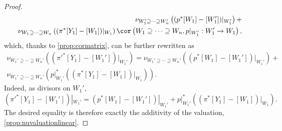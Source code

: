 \begin{proof}
\[\begin{split}
        \nu_{W_1'\supseteq \cdots \supseteq W_n'}\left((p^*[W_1]-[W_1'])|_{W_1'}\right)+\\
        \nu_{W_1\supseteq \cdots \supseteq W_n}\left((\pi^*[Y_1]-[W_1])|_{W_1}\right)\cor\left(W_1\supseteq \cdots \supseteq W_n,p|_{W_1'}:W_1'\rightarrow W_1\right),
    \end{split}
    \]
    which, thanks to \cref{prop:cormatrix}, can be further rewritten as
    \[
    \begin{split}
    \nu_{W_1'\supseteq \cdots \supseteq W_n'}\left((\pi'^*[Y_1]-[W_1'])|_{W_1'}\right)=
        \nu_{W_1'\supseteq \cdots \supseteq W_n'}\left((p^*[W_1]-[W_1'])|_{W_1'}\right)+\\
        \nu_{W_1'\supseteq \cdots \supseteq W_n'}\left(p|_{W_1'}^*\left((\pi^*[Y_1]-[W_1])|_{W_1} \right)\right).
    \end{split}
    \]
    Indeed, as divisors on $W_1'$,
    \[
        (\pi'^*[Y_1]-[W_1'])|_{W_1'}=(p^*[W_1]-[W_1'])|_{W_1'}+p|_{W_1'}^*((\pi^*[Y_1]-[W_1])|_{W_1}).
    \]
    The desired equality is therefore exactly the additivity of the valuation, \cref{prop:nuvaluationlinear}.
\end{proof}

